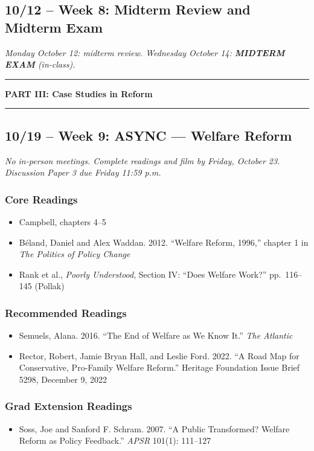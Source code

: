 \documentclass[12pt]{article}
\begin{document}
\subsection*{10/12 -- Week 8: Midterm Review and Midterm Exam}
\emph{Monday October 12: midterm review. Wednesday October 14: \textbf{MIDTERM EXAM} (in-class).}

\bigskip
\noindent\rule{\textwidth}{0.6pt}
\begin{center}\textbf{PART III: Case Studies in Reform}\end{center}
\noindent\rule{\textwidth}{0.6pt}

\subsection*{10/19 -- Week 9: \textbf{ASYNC} --- Welfare Reform}
\emph{No in-person meetings. Complete readings and film by Friday, October 23. Discussion Paper 3 due Friday 11:59 p.m.}
    \subsubsection*{Core Readings}
        \begin{itemize}
            \item Campbell, chapters 4--5
            \item Béland, Daniel and Alex Waddan. 2012. ``Welfare Reform, 1996,'' chapter 1 in \emph{The Politics of Policy Change}
            \item Rank et al., \emph{Poorly Understood}, Section IV: ``Does Welfare Work?'' pp.\ 116--145 (Pollak)
        \end{itemize}
    \subsubsection*{Recommended Readings}
        \begin{itemize}
            \item Semuels, Alana. 2016. ``The End of Welfare as We Know It.'' \emph{The Atlantic}
            \item Rector, Robert, Jamie Bryan Hall, and Leslie Ford. 2022. ``A Road Map for Conservative, Pro-Family Welfare Reform.'' Heritage Foundation Issue Brief 5298, December 9, 2022
        \end{itemize}
    \subsubsection*{Grad Extension Readings}
        \begin{itemize}
            \item Soss, Joe and Sanford F. Schram. 2007. ``A Public Transformed? Welfare Reform as Policy Feedback.'' \emph{APSR} 101(1): 111--127
        \end{itemize}
\end{document}

